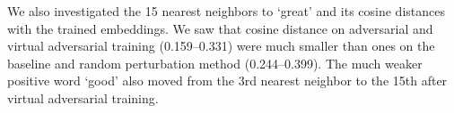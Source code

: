\documentclass{article}
\begin{document}
We also investigated the 15 nearest neighbors to `great' and its cosine
distances with the trained embeddings.
We saw that cosine distance on adversarial and virtual adversarial
training (0.159--0.331) were much smaller than ones on the baseline and random perturbation
method (0.244--0.399). The much weaker positive word `good' also moved from the 3rd nearest neighbor to the 15th after virtual adversarial training.
\begin{comment}
\begin{table}[ht]
  \centering
		\caption{\label{tab:kNN_great}15 top nearest neighbors to
`\textit{great}' and its cosine distances with the embeddings trained on each method.}
\scalebox{0.8}{
		\begin{tabular}{rcccccccc}
			\toprule
			&\multicolumn{8}{c}{`\textit{great}'}  \\
			\cmidrule{2-9}
			&\multicolumn{2}{c}{\textbf{baseline}} & \multicolumn{2}{c}{\textbf{random}} & \multicolumn{2}{c}{\textbf{adversarial}} & \multicolumn{2}{c}{\textbf{virtual adversarial}}\\
			\cmidrule{2-9}
			1&wonderful&0.244&excellent&0.239&excellent&0.169&wonderful&0.159\\
			2&excellent&0.248&wonderful&0.240&wonderful&0.172&excellent&0.163\\
			3&good&0.285&good&0.288&fantastic&0.213&fantastic&0.208\\
			4&fantastic&0.303&fantastic&0.295&brilliant&0.233&brilliant&0.226\\
			5&terrific&0.308&terrific&0.301&amazing&0.236&amazing&0.227\\
			6&brilliant&0.310&brilliant&0.305&terrific&0.247&terrific&0.234\\
			7&awesome&0.325&awesome&0.309&awesome&0.251&incredible&0.247\\
			8&amazing&0.330&amazing&0.332&incredible&0.263&awesome&0.248\\
			9&fine&0.343&fine&0.347&superb&0.282&superb&0.260\\
			10&incredible&0.350&incredible&0.347&outstanding&0.293&outstanding&0.288\\5
			11&superb&0.368&superb&0.355&magnificent&0.310&magnificent&0.299\\
			12&outstanding&0.375&outstanding&0.360&fine&0.314&marvelous&0.312\\
			13&marvelous&0.390&marvelous&0.375&marvelous&0.317&extraordinary&0.315\\
			14&magnificent&0.398&tremendous&0.387&good&0.321&fine&0.321\\
			15&tremendous&0.399&magnificent&0.389&extraordinary&0.333&good&0.331\\
\bottomrule
		\end{tabular}
		}
\end{table}
\end{comment}
\end{document}

